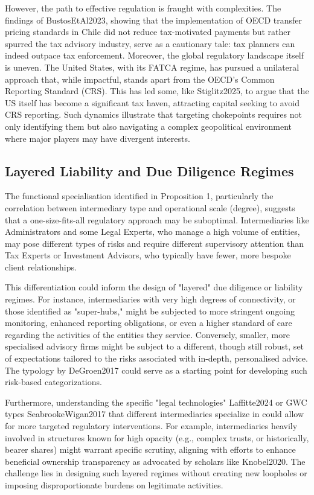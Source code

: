 However, the path to effective regulation is fraught with complexities. The findings of BustosEtAl2023, showing that the implementation of OECD transfer pricing standards in Chile did not reduce tax-motivated payments but rather spurred the tax advisory industry, serve as a cautionary tale: tax planners can indeed outpace tax enforcement. Moreover, the global regulatory landscape itself is uneven. The United States, with its FATCA regime, has pursued a unilateral approach that, while impactful, stands apart from the OECD's Common Reporting Standard (CRS). This has led some, like Stiglitz2025, to argue that the US itself has become a significant tax haven, attracting capital seeking to avoid CRS reporting. Such dynamics illustrate that targeting chokepoints requires not only identifying them but also navigating a complex geopolitical environment where major players may have divergent interests.

\subsection{Layered Liability and Due Diligence Regimes}
\label{subsec:layered_liability}

The functional specialisation identified in Proposition 1, particularly the correlation between intermediary type and operational scale (degree), suggests that a one-size-fits-all regulatory approach may be suboptimal. Intermediaries like Administrators and some Legal Experts, who manage a high volume of entities, may pose different types of risks and require different supervisory attention than Tax Experts or Investment Advisors, who typically have fewer, more bespoke client relationships.

This differentiation could inform the design of "layered" due diligence or liability regimes. For instance, intermediaries with very high degrees of connectivity, or those identified as "super-hubs," might be subjected to more stringent ongoing monitoring, enhanced reporting obligations, or even a higher standard of care regarding the activities of the entities they service. Conversely, smaller, more specialised advisory firms might be subject to a different, though still robust, set of expectations tailored to the risks associated with in-depth, personalised advice. The typology by DeGroen2017 could serve as a starting point for developing such risk-based categorizations.

Furthermore, understanding the specific "legal technologies" Laffitte2024 or GWC types SeabrookeWigan2017 that different intermediaries specialize in could allow for more targeted regulatory interventions. For example, intermediaries heavily involved in structures known for high opacity (e.g., complex trusts, or historically, bearer shares) might warrant specific scrutiny, aligning with efforts to enhance beneficial ownership transparency as advocated by scholars like Knobel2020. The challenge lies in designing such layered regimes without creating new loopholes or imposing disproportionate burdens on legitimate activities.

